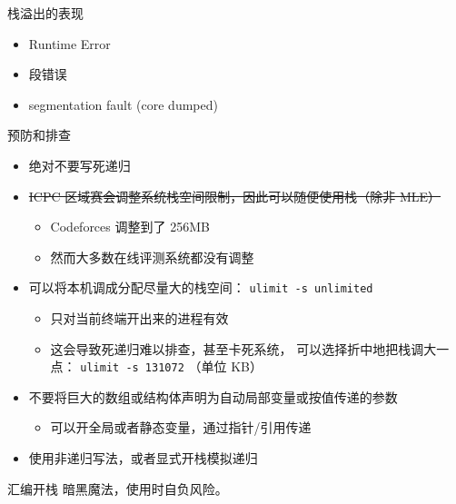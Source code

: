 \documentclass[10pt,mathserif]{beamer}%
\begin{document}
\begin{frame}{栈溢出的表现}
	\begin{itemize}
		\item Runtime Error
		\item 段错误
		\item segmentation fault (core dumped)
	\end{itemize}
\end{frame}

\begin{frame}{预防和排查}
	\begin{itemize}
		\item 绝对不要写死递归
		\item \sout{ICPC 区域赛会调整系统栈空间限制，因此可以随便使用栈（除非
			MLE）}
			\begin{itemize}
				\item Codeforces 调整到了 256MB
				\item 然而大多数在线评测系统都没有调整
			\end{itemize}
		\item 可以将本机调成分配尽量大的栈空间：
			\lstinline|ulimit -s unlimited|
			\begin{itemize}
				\item 只对当前终端开出来的进程有效
				\item 这会导致死递归难以排查，甚至卡死系统，
					可以选择折中地把栈调大一点：
					\lstinline|ulimit -s 131072| （单位 KB）
			\end{itemize}
		\item 不要将巨大的数组或结构体声明为自动局部变量或按值传递的参数
			\begin{itemize}
				\item 可以开全局或者静态变量，通过指针/引用传递
			\end{itemize}
		\item 使用非递归写法，或者显式开栈模拟递归
	\end{itemize}
\end{frame}

\begin{frame}{汇编开栈}
	暗黑魔法，使用时自负风险。
	
\end{frame}
\end{document}
